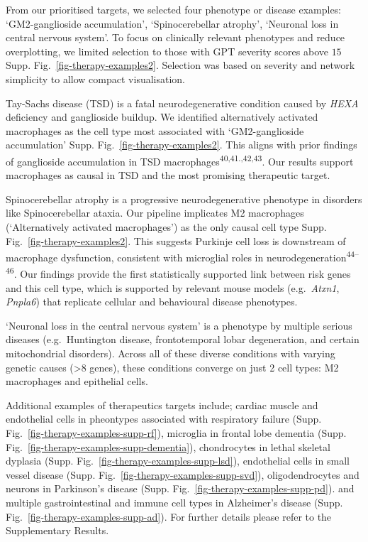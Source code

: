 \documentclass[
]{article}
\begin{document}
From our prioritised targets, we selected four phenotype or disease
examples: `GM2-ganglioside accumulation', `Spinocerebellar atrophy',
`Neuronal loss in central nervous system'. To focus on clinically
relevant phenotypes and reduce overplotting, we limited selection to
those with GPT severity scores above \(15\) Supp.
Fig.~\ref{fig-therapy-examples2}. Selection was based on severity and
network simplicity to allow compact visualisation.

Tay-Sachs disease (TSD) is a fatal neurodegenerative condition caused by
\emph{HEXA} deficiency and ganglioside buildup. We identified
alternatively activated macrophages as the cell type most associated
with `GM2-ganglioside accumulation' Supp.
Fig.~\ref{fig-therapy-examples2}. This aligns with prior findings of
ganglioside accumulation in TSD
macrophages\textsuperscript{40,41.,42,43}. Our results support
macrophages as causal in TSD and the most promising therapeutic target.

Spinocerebellar atrophy is a progressive neurodegenerative phenotype in
disorders like Spinocerebellar ataxia. Our pipeline implicates M2
macrophages (`Alternatively activated macrophages') as the only causal
cell type Supp. Fig.~\ref{fig-therapy-examples2}. This suggests Purkinje
cell loss is downstream of macrophage dysfunction, consistent with
microglial roles in neurodegeneration\textsuperscript{44--46}. Our
findings provide the first statistically supported link between risk
genes and this cell type, which is supported by relevant mouse models
(e.g.~\emph{Atxn1}, \emph{Pnpla6}) that replicate cellular and
behavioural disease phenotypes.

`Neuronal loss in the central nervous system' is a phenotype by multiple
serious diseases (e.g.~Huntington disease, frontotemporal lobar
degeneration, and certain mitochondrial disorders). Across all of these
diverse conditions with varying genetic causes (\textgreater8 genes),
these conditions converge on just 2 cell types: M2 macrophages and
epithelial cells.

Additional examples of therapeutics targets include; cardiac muscle and
endothelial cells in pheontypes associated with respiratory failure
(Supp. Fig.~\ref{fig-therapy-examples-supp-rf}), microglia in frontal
lobe dementia (Supp. Fig.~\ref{fig-therapy-examples-supp-dementia}),
chondrocytes in lethal skeletal dyplasia (Supp.
Fig.~\ref{fig-therapy-examples-supp-lsd}), endothelial cells in small
vessel disease (Supp. Fig.~\ref{fig-therapy-examples-supp-svd}),
oligodendrocytes and neurons in Parkinson's disease (Supp.
Fig.~\ref{fig-therapy-examples-supp-pd}). and multiple gastrointestinal
and immune cell types in Alzheimer's disease (Supp.
Fig.~\ref{fig-therapy-examples-supp-ad}). For further details please
refer to the Supplementary Results.
\end{document}
